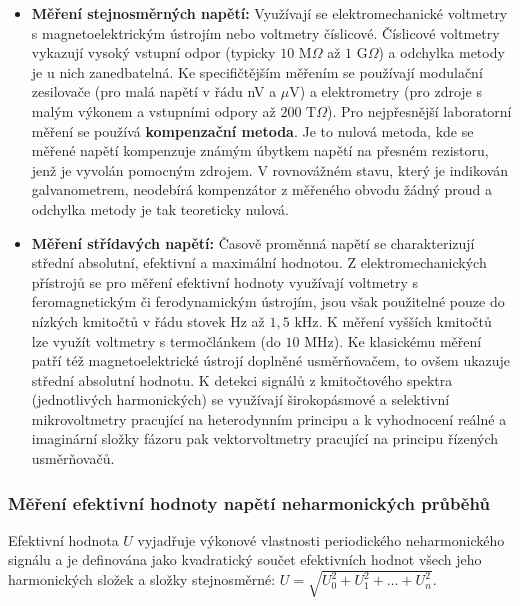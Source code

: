         \begin{itemize}
            \item \textbf{Měření stejnosměrných napětí:} Využívají se elektromechanické voltmetry s magnetoelektrickým ústrojím nebo voltmetry číslicové. Číslicové voltmetry vykazují vysoký vstupní odpor (typicky $10\text{ M}\Omega$ až $1\text{ G}\Omega$) a odchylka metody je u nich zanedbatelná. Ke specifičtějším měřením se používají modulační zesilovače (pro malá napětí v řádu nV a $\mu$V) a elektrometry (pro zdroje s malým výkonem a vstupními odpory až $200\text{ T}\Omega$). Pro nejpřesnější laboratorní měření se používá \textbf{kompenzační metoda}. Je to nulová metoda, kde se měřené napětí kompenzuje známým úbytkem napětí na přesném rezistoru, jenž je vyvolán pomocným zdrojem. V rovnovážném stavu, který je indikován galvanometrem, neodebírá kompenzátor z měřeného obvodu žádný proud a odchylka metody je tak teoreticky nulová.
            \item \textbf{Měření střídavých napětí:} Časově proměnná napětí se charakterizují střední absolutní, efektivní a maximální hodnotou. Z elektromechanických přístrojů se pro měření efektivní hodnoty využívají voltmetry s feromagnetickým či ferodynamickým ústrojím, jsou však použitelné pouze do nízkých kmitočtů v řádu stovek Hz až $1{,}5\text{ kHz}$. K měření vyšších kmitočtů lze využít voltmetry s termočlánkem (do $10\text{ MHz}$). Ke klasickému měření patří též magnetoelektrické ústrojí doplněné usměrňovačem, to ovšem ukazuje střední absolutní hodnotu. K detekci signálů z kmitočtového spektra (jednotlivých harmonických) se využívají širokopásmové a selektivní mikrovoltmetry pracující na heterodynním principu a k vyhodnocení reálné a imaginární složky fázoru pak vektorvoltmetry pracující na principu řízených usměrňovačů.
        \end{itemize}
    \subsubsection{Měření efektivní hodnoty napětí neharmonických průběhů}
        Efektivní hodnota $U$ vyjadřuje výkonové vlastnosti periodického neharmonického signálu a je definována jako kvadratický součet efektivních hodnot všech jeho harmonických složek a složky stejnosměrné: $U = \sqrt{U_0^2 + U_1^2 + \dots + U_n^2}$.
        
